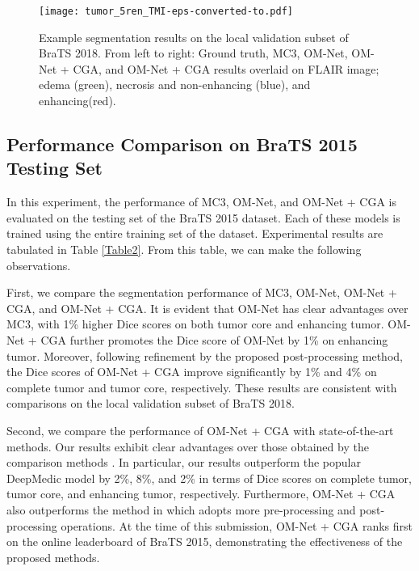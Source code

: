 \documentclass[journal,twoside]{IEEEtran}
\begin{document}
\begin{figure*}
	\setlength{\belowcaptionskip}{-60.cm}
	\centering 
	\texttt{[image: tumor\_5ren\_TMI-eps-converted-to.pdf]}
	\caption{Example segmentation results on the local validation subset of BraTS 2018. From left to right: Ground truth, MC3, OM-Net, OM-Net + CGA, and OM-Net + CGA results overlaid on FLAIR image; edema (green), necrosis and non-enhancing (blue), and enhancing(red).
	}
	\label{Fig.S2}
	
\end{figure*}



\subsection{Performance Comparison on BraTS 2015 Testing Set}
In this experiment, the performance of MC3, OM-Net, and OM-Net + CGA is evaluated on the testing set of the BraTS 2015 dataset. Each of these models is trained using the entire training set of the dataset. Experimental results are tabulated in Table \ref{Table2}. From this table, we can make the following observations.



First, we compare the segmentation performance of MC3, OM-Net, OM-Net + CGA, and OM-Net + CGA. It is evident that OM-Net has clear advantages over MC3, with 1\% higher Dice scores on both tumor core and enhancing tumor. OM-Net + CGA further promotes the Dice score of OM-Net by 1\% on enhancing tumor. Moreover, following refinement by the proposed post-processing method, the Dice scores of OM-Net + CGA improve significantly by 1\% and 4\% on complete tumor and tumor core, respectively. These results are consistent with comparisons on the local validation subset of BraTS 2018.




Second, we compare the performance of OM-Net + CGA with state-of-the-art methods. Our results exhibit clear advantages over those obtained by the comparison methods \cite{isensee2017brain,chen2018focus, kamnitsas2017efficient,zhao2018deep}. In particular, our results outperform the popular DeepMedic model \cite{kamnitsas2017efficient} by 2\%, 8\%, and 2\% in terms of Dice scores on complete tumor, tumor core, and enhancing tumor, respectively. Furthermore, OM-Net + CGA also outperforms the method in \cite{zhao2018deep} which adopts more pre-processing and post-processing operations. At the time of this submission, OM-Net + CGA ranks first on the online leaderboard of BraTS 2015, demonstrating the effectiveness of the proposed methods.
\end{document}
